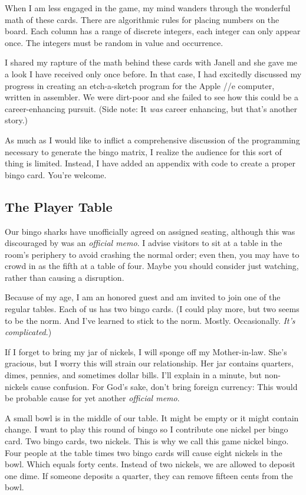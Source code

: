 \documentclass[
  letterpaper,
  DIV=11,
  numbers=noendperiod]{scrartcl}
\begin{document}
When I am less engaged in the game, my mind wanders through the
wonderful math of these cards. There are algorithmic rules for placing
numbers on the board. Each column has a range of discrete integers, each
integer can only appear once. The integers must be random in value and
occurrence.

I shared my rapture of the math behind these cards with Janell and she
gave me a look I have received only once before. In that case, I had
excitedly discussed my progress in creating an etch-a-sketch program for
the Apple //e computer, written in assembler. We were dirt-poor and she
failed to see how this could be a career-enhancing pursuit. (Side note:
It \emph{was} career enhancing, but that's another story.)

As much as I would like to inflict a comprehensive discussion of the
programming necessary to generate the bingo matrix, I realize the
audience for this sort of thing is limited. Instead, I have added an
appendix with code to create a proper bingo card. You're welcome.

\hypertarget{the-player-table}{%
\subsection{The Player Table}\label{the-player-table}}

Our bingo sharks have unofficially agreed on assigned seating, although
this was discouraged by was an \emph{official memo}. I advise visitors
to sit at a table in the room's periphery to avoid crashing the normal
order; even then, you may have to crowd in as the fifth at a table of
four. Maybe you should consider just watching, rather than causing a
disruption.

Because of my age, I am an honored guest and am invited to join one of
the regular tables. Each of us has two bingo cards. (I could play more,
but two seems to be the norm. And I've learned to stick to the norm.
Mostly. Occasionally. \emph{It's complicated}.)

If I forget to bring my jar of nickels, I will sponge off my
Mother-in-law. She's gracious, but I worry this will strain our
relationship. Her jar contains quarters, dimes, pennies, and sometimes
dollar bills. I'll explain in a minute, but non-nickels cause confusion.
For God's sake, don't bring foreign currency: This would be probable
cause for yet another \emph{official memo}.

A small bowl is in the middle of our table. It might be empty or it
might contain change. I want to play this round of bingo so I contribute
one nickel per bingo card. Two bingo cards, two nickels. This is why we
call this game nickel bingo. Four people at the table times two bingo
cards will cause eight nickels in the bowl. Which equals forty cents.
Instead of two nickels, we are allowed to deposit one dime. If someone
deposits a quarter, they can remove fifteen cents from the bowl.
\end{document}
